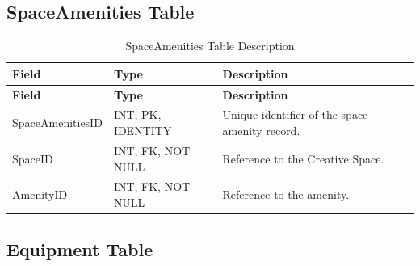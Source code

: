 \subsection{SpaceAmenities Table}

\begin{longtable}{
		|>{\raggedright\arraybackslash}p{3.2cm}|
		>{\raggedright\arraybackslash}p{4.2cm}|
		>{\raggedright\arraybackslash}p{5.0cm}|
	}
	\caption{SpaceAmenities Table Description}
	\label{tab:space-amenities}\\
	\hline
	\textbf{Field} & \textbf{Type} & \textbf{Description} \\ \hline
	\endfirsthead
	\hline
	\textbf{Field} & \textbf{Type} & \textbf{Description} \\ \hline
	\endhead
	
	SpaceAmenitiesID & INT, PK, IDENTITY &
	Unique identifier of the space-amenity record. \\ \hline
	
	SpaceID & INT, FK, NOT NULL &
	Reference to the Creative Space. \\ \hline
	
	AmenityID & INT, FK, NOT NULL &
	Reference to the amenity. \\ \hline
	
\end{longtable}


\subsection{Equipment Table}

